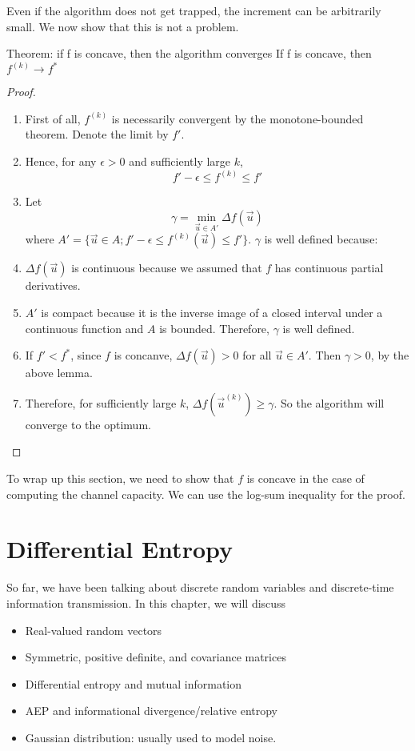 \documentclass[../main.tex]{subfiles}
\begin{document}
Even if the algorithm does not get trapped, the increment can be arbitrarily small. We now show that this is not a problem.
\begin{bbox}{{Theorem: if f is concave, then the algorithm converges}}
    If f is concave, then $f^{(k)}\to f^*$
    \begin{proof}
        \begin{enumerate}
            \item First of all, $f^{(k)}$ is necessarily convergent by the monotone-bounded theorem. Denote the limit by $f'$.
            \item Hence, for any $\epsilon > 0$ and sufficiently large $k$,
            \[
            f' - \epsilon \leq f^{(k)}\leq f'
            \]
            \item Let \[
            \gamma = \min_{\vec u\in A'} \Delta f(\vec u)
            \]
            where $A'=\{\vec u\in A; f' - \epsilon \leq f^{(k)}(\vec u)\leq f'\}$. $\gamma$ is well defined because:
            \item $\Delta f(\vec u)$ is continuous because we assumed that $f$ has continuous partial derivatives.
            \item $A'$ is compact because it is the inverse image of a closed interval under a continuous function and $A$ is bounded. Therefore, $\gamma$ is well defined.
            \item If $f' < f^*$, since $f$ is concanve, $\Delta f(\vec u)>0$ for all $\vec u\in A'$. Then $\gamma >0$, by the above lemma.
            \item Therefore, for sufficiently large $k$, $\Delta f(\vec u^{(k)})\geq \gamma$. So the algorithm will converge to the optimum.
        \end{enumerate}
    \end{proof}
\end{bbox}
To wrap up this section, we need to show that $f$ is concave in the case of computing the channel capacity. We can use the log-sum inequality for the proof.



\chapter{Differential Entropy}
So far, we have been talking about discrete random variables and discrete-time information transmission. In this chapter, we will discuss \begin{itemize}
    \item Real-valued random vectors
    \item Symmetric, positive definite, and covariance matrices
    \item Differential entropy and mutual information
    \item AEP and informational divergence/relative entropy
    \item Gaussian distribution: usually used to model noise.
\end{itemize}
\end{document}
